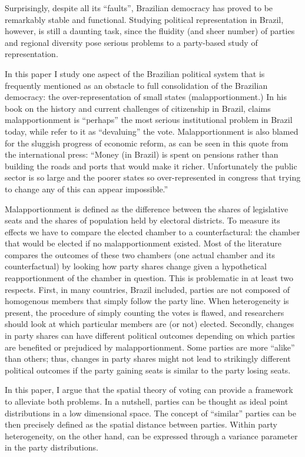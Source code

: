 Surprisingly, despite all its ``faults'', Brazilian democracy has proved to be remarkably stable and functional. Studying political representation in Brazil, however, is still a daunting task,  since the fluidity (and sheer number) of parties and  regional diversity   pose serious problems to a party-based study of representation.  

In this paper I study one  aspect of the Brazilian political system that is frequently mentioned as an obstacle to full consolidation  of the Brazilian democracy: the over-representation of small states (malapportionment.) In his book on the history and current challenges of citizenship in Brazil, \citet[][p.30]{carvalho:2001} claims malapportionment is ``perhaps'' the most serious institutional problem in Brazil today, while \cite{samuels:2001a} refer to it as ``devaluing'' the vote. Malapportionment is also blamed for the sluggish progress of economic reform, as can be seen in this quote from the international press\citep[][p.82]{economist:2008}: ``Money (in Brazil) is spent on pensions rather than building the roads and ports that would make it richer. Unfortunately the public sector is so large and the poorer states so over-represented in congress that trying to change any of this can appear impossible.''

Malapportionment is defined as the difference between the shares of legislative seats and the shares of population held by electoral districts.\citep{Samuels:2001} To measure its effects we have to compare the elected chamber to a counterfactural: the chamber that would be elected if no malapportionment existed. Most of the literature compares the outcomes of these two chambers (one actual chamber and its counterfactual) by looking how party shares change given a hypothetical reapportionment of the chamber in question. This is problematic in at least two respects. First, in many countries, Brazil included, parties are not composed of homogenous members that simply follow the party line. When heterogeneity is present, the procedure of simply counting the votes is flawed, and researchers should look at which particular members are (or not) elected. Secondly, changes in party shares can have different political outcomes depending on which parties are benefited or prejudiced by malapportionment. Some parties are more ``alike'' than others; thus, changes in party shares might not lead to strikingly different political outcomes if the party gaining seats is similar to the party losing seats.

In this paper, I argue that the spatial theory of voting can provide a framework to alleviate both problems. In a nutshell, parties can be thought as ideal point distributions in a low dimensional space. The concept of ``similar'' parties can be then precisely defined as the spatial distance between parties. Within party heterogeneity, on the other hand,  can be expressed through a variance parameter in the party distributions. 

